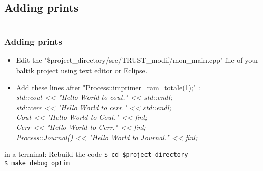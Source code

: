 \documentclass[10pt, hyperref={unicode=true,pdfusetitle, bookmarks=true,bookmarksnumbered=false,bookmarksopen=false, breaklinks=false,pdfborder={0 0 1},backref=true,colorlinks=true,linkcolor=darkblue,pageanchor, urlcolor=darkblue}]{beamer}
\begin{document}
\subsection{{\bf{Adding prints}}}
\begin{frame}
\begin{columns}[c] 
\tableofcontents[sections={1-4},currentsection, currentsubsection]
\tableofcontents[sections={5-10},currentsection, currentsubsection]
\end{columns}
\end{frame}
\begin{frame}
\frametitle{Adding prints}

\begin{block}{}
\begin{itemize}
\item Edit the "\$project\_directory/src/TRUST\_modif/mon\_main.cpp" file of your baltik project using text editor or Eclipse.
\item Add these lines after "Process::imprimer\_ram\_totale(1);" :\\
\textit{std::cout <\textcompwordmark{}< "Hello World to cout." <\textcompwordmark{}< std::endl;\\
std::cerr <\textcompwordmark{}< "Hello World to cerr." <\textcompwordmark{}< std::endl;\\
Cout <\textcompwordmark{}< "Hello World to Cout." <\textcompwordmark{}< finl;\\
Cerr <\textcompwordmark{}< "Hello World to Cerr." <\textcompwordmark{}< finl;\\
Process::Journal() <\textcompwordmark{}< "Hello World to Journal." <\textcompwordmark{}< finl;}\\
\end{itemize}
\end{block}


\begin{block}{in a terminal: Rebuild the code}
\texttt{\$ cd \$project\_directory}\\
\texttt{\$ make debug optim}\\
\end{block}

\end{frame}
\end{document}
